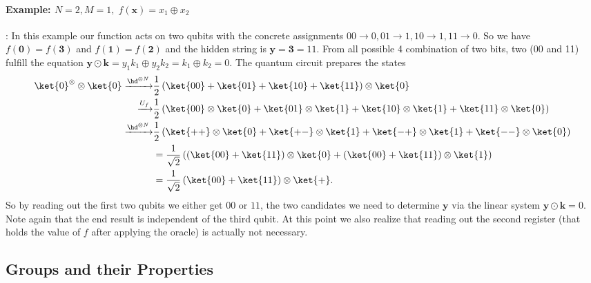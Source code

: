 \paragraph{Example: $N=2,M=1,\; f(\mathbf{x})=x_1\oplus x_2$}: In this example our function acts on two qubits with the concrete assignments $00\rightarrow 0, 01\rightarrow 1, 10 \rightarrow 1, 11 \rightarrow0$. So we have $f(\mathbf{0})=f(\mathbf{3})$ and $f(\mathbf{1})=f(\mathbf{2})$ and the hidden string is $\mathbf{y}=\mathbf{3}=11$. From all possible 4 combination of two bits, two (00 and 11) fulfill the equation $\mathbf{y} \odot \mathbf{k} = y_1k_1 \oplus y_2k_2 = k_1 \oplus k_2=0$. The quantum circuit prepares the states
\begin{align}
    \ket{0}^{\otimes}\otimes \ket{0} \xrightarrow[]{\hd^{\otimes N}}& \frac{1}{2}\left(\ket{00} + \ket{01} + \ket{10} + \ket{11}\right)\otimes \ket{0}\\
    \xrightarrow[]{U_f}& \frac{1}{2} \left(\ket{00}\otimes\ket{0} + \ket{01}\otimes\ket{1} + \ket{10}\otimes \ket{1} + \ket{11}\otimes \ket{0}\right)\nonumber\\
    \xrightarrow[]{\hd^{\otimes N}}& \frac{1}{2} \left(\ket{++}\otimes\ket{0} + \ket{+-}\otimes\ket{1} + \ket{-+}\otimes \ket{1} + \ket{--}\otimes \ket{0}\right)\nonumber\\
    &= \frac{1}{\sqrt{2}}\left(\left(\ket{00} + \ket{11}\right)\otimes\ket{0} + \left(\ket{00} + \ket{11}\right)\otimes\ket{1}\right)\nonumber\\
    & =\frac{1}{\sqrt{2}}\left(\ket{00} + \ket{11}\right)\otimes\ket{+}.
\end{align}
So by reading out the first two qubits we either get $00$ or $11$, the two candidates we need to determine $\mathbf{y}$ via the linear system $\mathbf{y}\odot \mathbf{k}=0$. Note again that the end result is independent of the third qubit.
At this point we also realize that reading out the second register (that holds the value of $f$ after applying the oracle) is actually not necessary. 
\subsection{Groups and their Properties}

